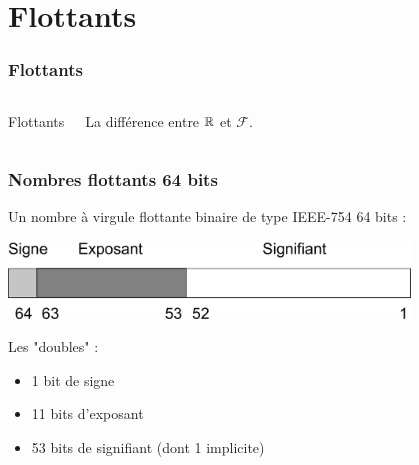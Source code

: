 \documentclass{beamer}
\begin{document}
\section{Flottants}

\begin{frame}
\frametitle{Flottants}
  \begin{columns}
    
    {\huge{Flottants}}
	
	La différence entre $\mathbb{R}$ et $\mathcal{F}$.
  \end{columns}
\end{frame}











\begin{frame}
\frametitle{Nombres flottants 64 bits}

Un nombre à virgule flottante binaire de type IEEE-754 64 bits :

\begin{center}
\includegraphics[width=0.8\textwidth]{doubleIEEE754}
\end{center}

Les "doubles" :
\begin{itemize}
\item 1 bit de signe
\item 11 bits d'exposant
\item 53 bits de signifiant (dont 1 implicite)
\end{itemize}

\end{frame}
\end{document}
